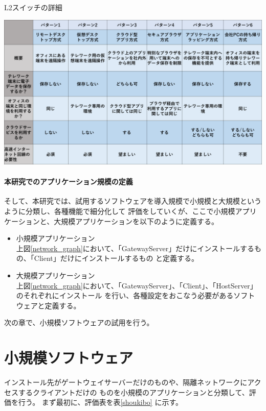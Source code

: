 \documentclass[11pt,a4j,titlepage]{jreport}
\begin{document}
\begin{table}[H]
    \centering
    \caption{L2スイッチの詳細}
    \includegraphics*[width=1.0\textwidth,page=7]{graphs/telework_list.pdf}
    \label{switch_detail}
\end{table}


\subsubsection{本研究でのアプリケーション規模の定義}
そして、本研究では、試用するソフトウェアを導入規模で小規模と大規模というように分類し、各種機能で細分化して
評価をしていくが、ここで小規模アプリケーションと、大規模アプリケーションを以下のように定義する。


\begin{itemize}
    \setlength{\parskip}{0.05cm} %
    \setlength{\itemsep}{0.05cm}
    \item 小規模アプリケーション\mbox{}\\
    上図\ref{network_graph}において、「GatewayServer」だけにインストールするもの、「Client」だけにインストールするもの
    と定義する。
    \item 大規模アプリケーション\mbox{}\\
    上図\ref{network_graph}において、「GatewayServer」、「Client」、「HostServer」のそれぞれにインストール
    を行い、各種設定をおこなう必要があるソフトウェアと定義する。


\end{itemize}

次の章で、小規模ソフトウェアの試用を行う。

\chapter{小規模ソフトウェア}
インストール先がゲートウェイサーバーだけのものや、隔離ネットワークにアクセスするクライアントだけの
ものを小規模のアプリケーションと分類して、評価を行う。
まず最初に、評価表を表\ref{shoukibo} に示す。
\end{document}
